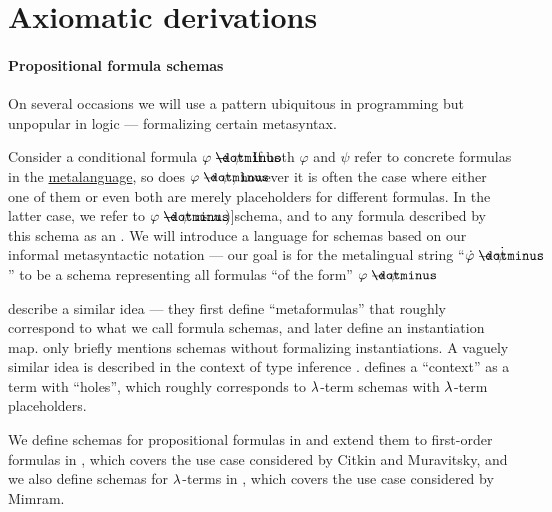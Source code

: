 \section{Axiomatic derivations}\label{sec:axiomatic_derivations}

\paragraph{Propositional formula schemas}

\begin{concept}\label{con:schemas_and_instances}
  On several occasions we will use a pattern ubiquitous in programming but unpopular in logic --- formalizing certain metasyntax.

  Consider a conditional formula \( \varphi \synimplies \psi \). If both \( \varphi \) and \( \psi \) refer to concrete formulas in the \hyperref[con:metalanguage]{metalanguage}, so does \( \varphi \synimplies \psi \), however it is often the case where either one of them or even both are merely placeholders for different formulas. In the latter case, we refer to \( \varphi \synimplies \psi \) as a \term[ru=схема (формул) (\cite[20]{Эдельман1975Логика})]{schema}, and to any formula described by this schema as an . We will introduce a language for schemas based on our informal metasyntactic notation --- our goal is for the metalingual string \enquote{\( \syn\varphi \synimplies \syn\psi \)} to be a schema representing all formulas \enquote{of the form} \( \varphi \synimplies \psi \).

   describe a similar idea --- they first define \enquote{metaformulas} that roughly correspond to what we call formula schemas, and later define an instantiation map.  only briefly mentions schemas without formalizing instantiations. A vaguely similar idea is described in the context of type inference .  defines a \enquote{context} as a term with \enquote{holes}, which roughly corresponds to \( \mathrm{\lambda} \)-term schemas with \( \mathrm{\lambda} \)-term placeholders.

  We define schemas for propositional formulas in  and extend them to first-order formulas in , which covers the use case considered by Citkin and Muravitsky, and we also define schemas for \( \mathrm{\lambda} \)-terms in , which covers the use case considered by Mimram.
\end{concept}

